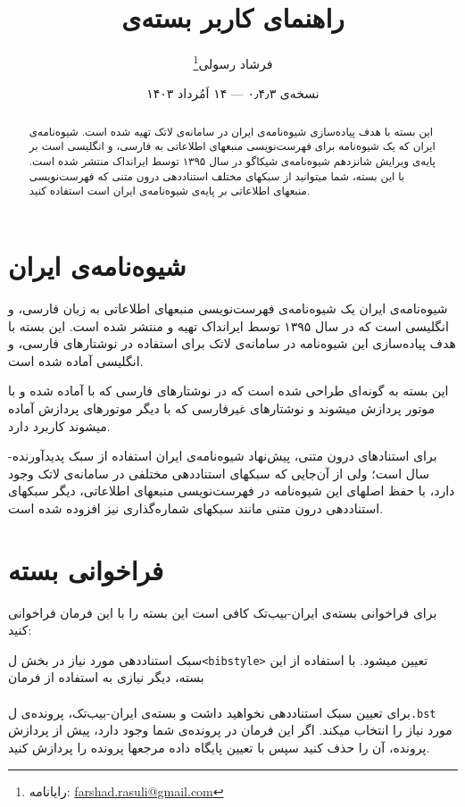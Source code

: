 \documentclass[a4paper,11pt]{article}
\begin{document}
\title{راهنمای کاربر بسته‌ی }
\author{فرشاد رسولی\thanks{رایانامه: \url{farshad.rasuli@gmail.com}}}
\date{نسخه‌ی ۰٫۴٫۳ --- ۱۴ اَمُرداد ۱۴۰۳}
\maketitle


\begin{abstract}
این بسته با هدف پیاده‌سازی شیوه‌نامه‌ی ایران در سامانه‌ی لاتک تهیه شده است. شیوه‌نامه‌ی ایران که یک شیوه‌نامه برای فهرست‌نویسی منبعهای اطلاعاتی به فارسی، و انگلیسی است بر پایه‌ی ویرایش شانزدهم شیوه‌نامه‌ی شیکاگو در سال ۱۳۹۵ توسط ایرانداک منتشر شده است. با این بسته، شما میتوانید از سبکهای مختلف استناددهی درون متنی که فهرست‌نویسی منبعهای اطلاعاتی بر پایه‌ی شیوه‌نامه‌ی ایران است استفاده کنید.
\end{abstract}



\section{شیوه‌نامه‌ی ایران}
شیوه‌نامه‌ی ایران یک شیوه‌نامه‌ی فهرست‌نویسی منبعهای اطلاعاتی به زبان فارسی، و انگلیسی است که در سال ۱۳۹۵ توسط ایرانداک تهیه و منتشر شده است. این بسته با هدف پیاده‌سازی این شیوه‌نامه در سامانه‌ی لاتک برای استفاده در نوشتارهای فارسی، و انگلیسی آماده شده است.


این بسته به گونه‌ای طراحی شده است که در نوشتارهای فارسی که با \XePersian{} آماده شده و با موتور \XeTeX{} پردازش میشوند و نوشتارهای غیرفارسی که با دیگر موتورهای پردازش آماده میشوند کاربرد دارد.


برای استنادهای درون متنی، پیش‌نهاد شیوه‌نامه‌ی ایران استفاده از سبک پدیدآورنده-سال است؛ ولی از آن‌جایی که سبکهای استناددهی مختلفی در سامانه‌ی لاتک وجود دارد، با حفظ اصلهای این شیوه‌نامه در فهرست‌نویسی منبعهای اطلاعاتی، دیگر سبکهای استناددهی درون متنی مانند سبکهای شماره‌گذاری نیز افزوده شده است.


\section{فراخوانی بسته}
برای فراخوانی بسته‌ی ایران-بیب‌تک کافی است این بسته را با این فرمان فراخوانی کنید:\\
\hspace*{\fill}


سبک استناددهی مورد نیاز در بخش \م‌ل{\tt <bibstyle>} تعیین میشود. با استفاده از این بسته، دیگر نیازی به استفاده از فرمان\\
\hspace*{\fill}\\
برای تعیین سبک استناددهی نخواهید داشت و بسته‌ی ایران-بیب‌تک، پرونده‌ی \م‌ل{\tt *.bst} مورد نیاز را انتخاب میکند. اگر این فرمان در پرونده‌ی شما وجود دارد، پیش از پردازش پرونده، آن را حذف کنید سپس با تعیین پایگاه داده مرجعها پرونده را پردازش کنید.
\end{document}
